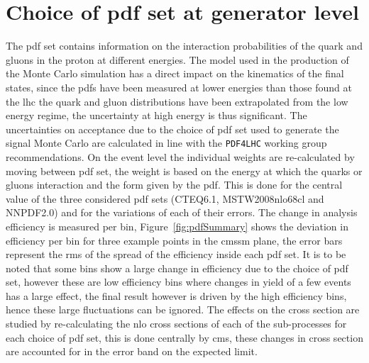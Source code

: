 \section{Choice of \ac{pdf} set at generator level} %
\label{sub:choice_of_pdf_set_at_generator_level_}
The \ac{pdf} set contains information on the interaction probabilities of the 
quark and gluons in the proton at different energies. The model used in the 
production of the Monte Carlo simulation has a direct impact on the kinematics 
of the final states, since the \ac{pdf}s have been measured at lower energies 
than those found at the \ac{lhc} the quark and gluon distributions have been 
extrapolated from the low energy regime, the uncertainty at high energy is thus 
significant.
The uncertainties on acceptance due to the choice of \ac{pdf} set used to 
generate the signal Monte Carlo are calculated in line with the 
\texttt{PDF4LHC} working group recommendations. On the event 
level the individual weights are re-calculated by moving between \ac{pdf} set, 
the weight is based on the energy at which the quarks or gluons interaction and 
the form given by the \ac{pdf}. This is done for the central value of the three 
considered \ac{pdf} sets (CTEQ6.1, MSTW2008nlo68cl and 
NNPDF2.0) and for the variations of each of their errors. The 
change in analysis efficiency is measured per \HT bin, 
Figure~\ref{fig:pdfSummary} shows the deviation in efficiency per bin for three 
example points in the \ac{cmssm} plane, the error bars represent the \ac{rms} 
of the spread of the efficiency inside each \ac{pdf} set. It is to be noted 
that some bins show a large change in efficiency due to the choice of \ac{pdf} 
set, however these are low efficiency bins where changes in yield of a few 
events has a large effect, the final result however is driven by the high 
efficiency bins, hence these large fluctuations can be ignored. The effects on 
the cross section are studied by re-calculating the \ac{nlo} cross sections of 
each of the sub-processes for each choice of \ac{pdf} set, this is done 
centrally by \ac{cms}, these changes in cross section are accounted for in the 
error band on the expected limit.

